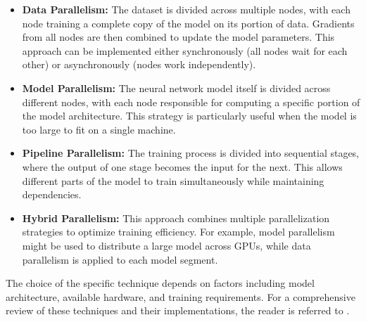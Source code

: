 \begin{itemize}
	\item \textbf{Data Parallelism:}
	      The dataset is divided across multiple nodes, with each node training a complete copy of the
	      model on its portion of data. Gradients from all nodes are then combined to update the model parameters.
	      This approach can be implemented either synchronously (all nodes wait for each other) or asynchronously (nodes work independently).

	\item \textbf{Model Parallelism:}
	      The neural network model itself is divided across different nodes, with each node responsible
	      for computing a specific portion of the model architecture. This strategy is particularly useful
	      when the model is too large to fit on a single machine.

	\item \textbf{Pipeline Parallelism:}
	      The training process is divided into sequential stages,
	      where the output of one stage becomes the input for the next. This allows different parts
	      of the model to train simultaneously while maintaining dependencies.

	\item \textbf{Hybrid Parallelism:}
	      This approach combines multiple parallelization strategies to optimize training efficiency.
	      For example, model parallelism might be used to distribute a large model across GPUs, while
	      data parallelism is applied to each model segment.
\end{itemize}

The choice of the specific technique depends on factors including model architecture, available
hardware, and training requirements. For a comprehensive review of these techniques and their
implementations, the reader is referred to \cite{chahal_hitchhikers_2018}.

%
%

